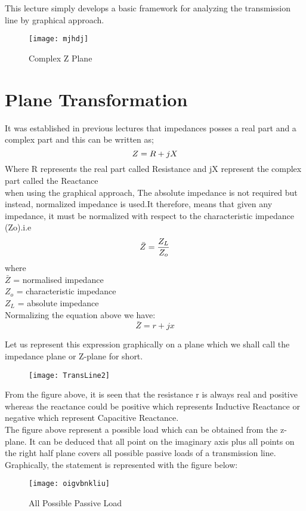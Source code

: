 This lecture simply develops a basic framework for analyzing the transmission line by graphical approach.
\begin{figure}[h]
	\centering
	\texttt{[image: mjhdj]}
	\caption{Complex Z Plane}
	\label{fig:mjhdj}
\end{figure}
\section{Plane Transformation}
It was established in previous lectures that impedances posses a real part and a complex part and this can be written as;
\begin{equation*}
Z= R+jX\\
\end{equation*}
Where R  represents the real part called Resistance
and jX represent the complex part called the Reactance\\
when using the graphical approach, The absolute impedance is not required but instead, normalized impedance is used.It therefore, means that given any impedance, it must be normalized with respect to the characteristic impedance (Zo).i.e
\begin{equation*}
\bar{Z}=\frac{Z_L}{Z_o}\\
\end{equation*}
where\\
$\bar{Z}$ = normalised impedance\\
$Z_o$ = characteristic impedance\\
$Z_L$   =  absolute  impedance \\
Normalizing the equation above we have:\\    
\begin{equation*}
\bar{Z}= r + jx
\end{equation*}



Let us represent this expression graphically on a plane which we shall call the impedance plane or Z-plane for short.
\begin{figure}
\center\texttt{[image: TransLine2]}
\label{fig:transline2}
\end{figure}

From the figure above, it is seen that the resistance r is always real and positive whereas the reactance could be positive which represents Inductive Reactance or negative which represent Capacitive Reactance.\\
The figure above represent a possible load which can be obtained from the z-plane.  It can be deduced that all point on the imaginary axis plus all points on the right half plane covers all possible passive loads of a transmission line.
Graphically, the statement is represented with the figure below:
\begin{figure}[h]
	\centering
	\texttt{[image: oigvbnkliu]}
	\caption{All Possible Passive Load}
	\label{fig:oigvbnkliu}
\end{figure}

